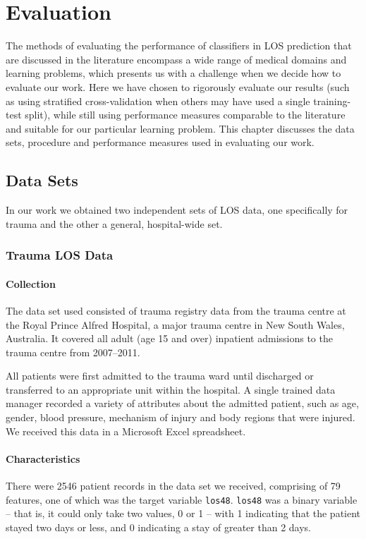 \chapter{Evaluation} \label{chap:evaluation}

The methods of evaluating the performance of classifiers in LOS prediction
that are discussed in the literature encompass a wide range of medical
domains and learning problems, which presents us with a challenge when we
decide how to evaluate our work. Here we have chosen to rigorously evaluate
our results (such as using stratified cross-validation when others may have
used a single training-test split), while still using performance measures
comparable to the literature and suitable for our particular learning problem.
This chapter discusses the data sets, procedure and performance measures used
in evaluating our work.

\section{Data Sets}
In our work we obtained two independent sets of LOS data, one specifically for
trauma and the other a general, hospital-wide set.

\subsection{Trauma LOS Data}
\subsubsection{Collection}
The data set used consisted of trauma registry data from the trauma centre
at the Royal Prince Alfred Hospital, a major trauma centre in New South Wales,
Australia. It covered all adult (age 15 and over) inpatient admissions to the
trauma centre from 2007--2011. 

All patients were first admitted to the trauma ward until discharged
or transferred to an appropriate unit within the hospital. A single trained
data manager recorded a variety of attributes about the admitted patient,
such as age, gender, blood pressure, mechanism of injury and body regions
that were injured. We received this data in a Microsoft Excel spreadsheet.

\subsubsection{Characteristics}
There were 2546 patient records in the data set we received, comprising of 79
features, one of which was the target variable \texttt{los48}.
\texttt{los48} was a binary variable -- that is, it could only take two
values, 0 or 1 -- with 1 indicating that the patient stayed two days or less,
and 0 indicating a stay of greater than 2 days.

